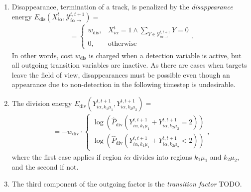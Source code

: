 \documentclass[10pt,twocolumn,letterpaper]{article}
\newcommand{\red}{\color{red}}
\begin{document}
\begin{enumerate}
      \item Disappearance, \ie termination of a track, is penalized by the \emph{disappearance}
    energy $E_{\mathrm{dis}}(X_{i\alpha}^t,  \mathcal{Y}_{i\alpha\rightarrow}^{t,t+1}) =$ 
    \begin{align}
        \label{eq:energy-dis}
         =
        \begin{cases}
            w_{\mathrm{dis}}, &  X_{i\alpha}^t = 1 \wedge \sum_{Y\in\mathcal{Y}_{i\alpha\rightarrow}^{t,t+1}}Y = 0 \\
            0, & \mathrm{otherwise}
        \end{cases}.
    \end{align}
    In other words, cost $w_{\mathrm{dis}}$ is charged when a detection variable is active, but all outgoing
    transition variables are inactive. As there are cases when targets leave the field of view,
    disappearances must be possible even though an appearance due to non-detection in the following
    timestep is undesirable.
      \item The division energy $E_{\mathrm{div}}(Y^{t,t+1}_{i\alpha , k_1 \mu_1}, Y^{t,t+1}_{i\alpha , k_2 \mu_2}) =$
    \begin{align}
        \label{eq:energy-div}
        =-w_{\mathrm{div}} \cdot
        \begin{cases}
            \log \left(\hat{P}_{\mathrm{div}}\left(Y^{t,t+1}_{i\alpha , k_1 \mu_1} + Y^{t,t+1}_{i\alpha , k_2 \mu_2} = 2\right) \right)\\
            \log \left(\hat{P}_{\mathrm{div}}\left(Y^{t,t+1}_{i\alpha , k_1 \mu_1} + Y^{t,t+1}_{i\alpha , k_2 \mu_2} < 2\right) \right)
        \end{cases},
    \end{align}
    where the first case applies if region $i\alpha$ divides into regions $k_1\mu_1$ and $k_2\mu_2$, and the second if not.
      \item The third component of the outgoing factor is the \emph{transition factor} {\red TODO}.
\end{enumerate}
\end{document}
